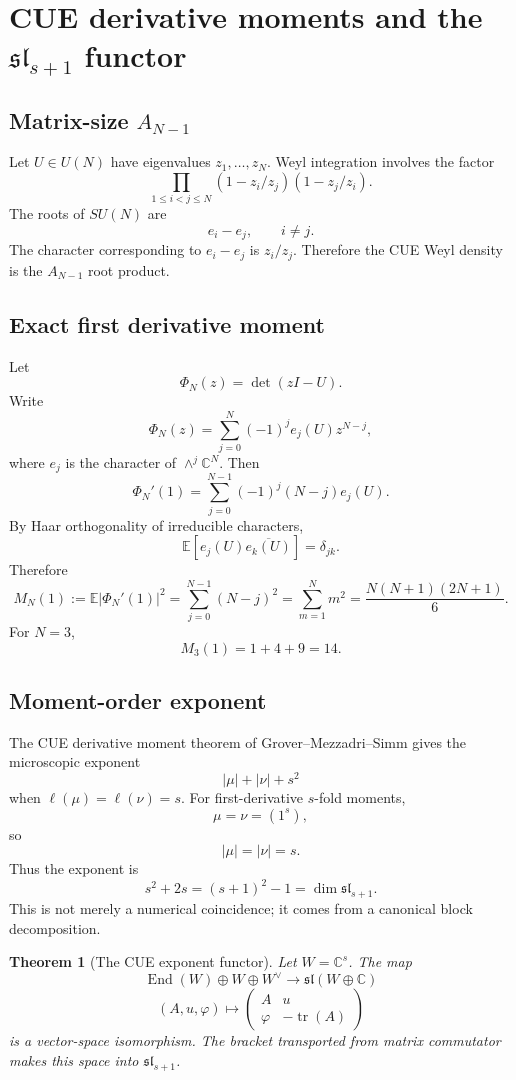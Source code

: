 \documentclass[11pt]{article}
\newtheorem{theorem}{Theorem}[section]
\DeclareMathOperator{\End}{End}
\DeclareMathOperator{\tr}{tr}
\newcommand{\CC}{\mathbb C}
\begin{document}
\section{CUE derivative moments and the $\mathfrak{sl}_{s+1}$ functor}

\subsection{Matrix-size $A_{N-1}$}

Let $U\in U(N)$ have eigenvalues $z_1,\ldots,z_N$.  Weyl integration involves the factor
\[
        \prod_{1\le i<j\le N}(1-z_i/z_j)(1-z_j/z_i).
\]
The roots of $SU(N)$ are
\[
        e_i-e_j,
        \qquad i\ne j.
\]
The character corresponding to $e_i-e_j$ is $z_i/z_j$.  Therefore the CUE Weyl density is the $A_{N-1}$ root product.

\subsection{Exact first derivative moment}

Let
\[
        \Phi_N(z)=\det(zI-U).
\]
Write
\[
        \Phi_N(z)=\sum_{j=0}^N(-1)^j e_j(U)z^{N-j},
\]
where $e_j$ is the character of $\wedge^j\CC^N$.  Then
\[
        \Phi_N'(1)=\sum_{j=0}^{N-1}(-1)^j(N-j)e_j(U).
\]
By Haar orthogonality of irreducible characters,
\[
        \mathbb E[e_j(U)\overline{e_k(U)}]=\delta_{jk}.
\]
Therefore
\[
        M_N(1):=\mathbb E|\Phi_N'(1)|^2
        =\sum_{j=0}^{N-1}(N-j)^2
        =\sum_{m=1}^N m^2
        =\frac{N(N+1)(2N+1)}6.
\]
For $N=3$,
\[
        M_3(1)=1+4+9=14.
\]

\subsection{Moment-order exponent}

The CUE derivative moment theorem of Grover--Mezzadri--Simm gives the microscopic exponent
\[
        |\mu|+|\nu|+s^2
\]
when $\ell(\mu)=\ell(\nu)=s$.  For first-derivative $s$-fold moments,
\[
        \mu=\nu=(1^s),
\]
so
\[
        |\mu|=|\nu|=s.
\]
Thus the exponent is
\[
        s^2+2s=(s+1)^2-1=\dim\mathfrak{sl}_{s+1}.
\]
This is not merely a numerical coincidence; it comes from a canonical block decomposition.

\begin{theorem}[The CUE exponent functor]
Let $W=\CC^s$.  The map
\[
        \End(W)\oplus W\oplus W^\vee
        \longrightarrow
        \mathfrak{sl}(W\oplus\CC)
\]
\[
        (A,u,\varphi)\longmapsto
        \begin{pmatrix}
        A&u\\
        \varphi&-\tr(A)
        \end{pmatrix}
\]
is a vector-space isomorphism.  The bracket transported from matrix commutator makes this space into $\mathfrak{sl}_{s+1}$.
\end{theorem}
\end{document}
